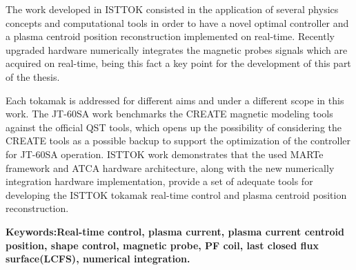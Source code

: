  The work developed in ISTTOK consisted in the application of several physics concepts and computational tools in order to have a novel optimal controller and a plasma centroid position reconstruction implemented on real-time. Recently upgraded hardware numerically integrates  the magnetic probes signals which are acquired on real-time, being this fact a key point for the development of this part of the thesis.\smallskip
 

 

Each tokamak is addressed for different aims and under a different scope in this work. The JT-60SA work benchmarks the CREATE magnetic modeling tools against the official QST tools, which opens up the possibility of considering the CREATE tools as a possible backup to support the optimization of the controller for JT-60SA operation. ISTTOK work demonstrates that the used MARTe framework and ATCA hardware architecture, along with the new numerically integration hardware implementation, provide a set of adequate tools for developing the ISTTOK tokamak real-time control and plasma centroid position reconstruction.
 


\textbf{Keywords:Real-time control, plasma current, plasma current centroid position,   shape control, magnetic probe, PF coil, last closed flux surface(LCFS), numerical integration.} 

